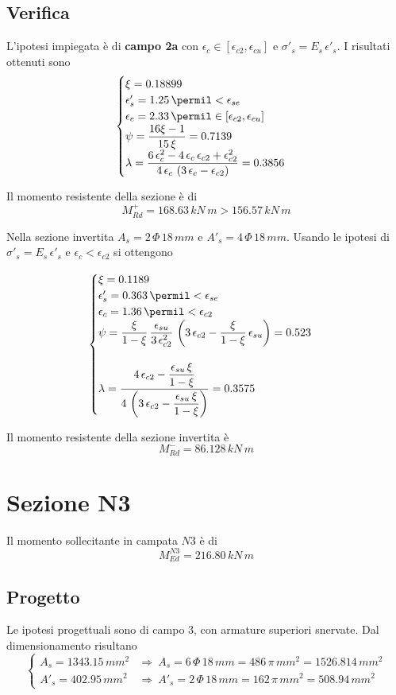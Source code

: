 \subsection{Verifica}
L'ipotesi impiegata è di \textbf{campo 2a} con $\epsilon_c \in \left[\epsilon_{c2}, \epsilon_{cu}\right]$ e $\sigma'_s = E_s\,\epsilon'_s$. I risultati ottenuti sono
\[
\begin{cases}
	\xi = 0.18899\\
	\epsilon'_s = 1.25\,\permil < \epsilon_{se}\\
	\epsilon_c = 2.33\,\permil \in \left[\epsilon_{c2}, \epsilon_{cu}\right]\\
	\psi = \dfrac{16\xi -1}{15\,\xi} = 0.7139 \\
	\lambda = \dfrac{6\,\epsilon_{c}^2 - 4\,\epsilon_{c}\,\epsilon_{c2} + \epsilon_{c2}^2}{4\,\epsilon_{c}\,\left(3\,\epsilon_c - \epsilon_{c2}\right)} = 0.3856
\end{cases}
\]

Il momento resistente della sezione è di
\[
M_{Rd}^+ = 168.63\,kN\,m > 156.57\,kN\,m
\]

Nella sezione invertita $A_s = 2\,\Phi\,18\,mm$ e $A'_s = 4\,\Phi\,18\,mm$. Usando le ipotesi di $\sigma'_s = E_s\,\epsilon'_s$ e $\epsilon_c < \epsilon_{c2}$ si ottengono

\[
\begin{cases}
	\xi = 0.1189\\
	\epsilon'_s = 0.363\,\permil<\epsilon_{se}\\
	\epsilon_c = 1.36\,\permil < \epsilon_{c2}\\
	\psi = \dfrac{\xi}{1-\xi}\,\dfrac{\epsilon_{su}}{3\,\epsilon_{c2}^2}\,\left(3\,\epsilon_{c2} - \dfrac{\xi}{1-\xi}\,\epsilon_{su}\right) = 0.523\\\\
	\lambda = \dfrac{4\,\epsilon_{c2} - \dfrac{\epsilon_{su}\,\xi}{1-\xi}}{4\,\left(3\,\epsilon_{c2} - \dfrac{\epsilon_{su}\,\xi}{1-\xi}\right)} = 0.3575
\end{cases}
\]

Il momento resistente della sezione invertita è
\[
M_{Rd}^- = 86.128\,kN\,m
\]

\section{Sezione N3}
Il momento sollecitante in campata $N3$ è di 
\[
M_{Ed}^{N3} = 216.80\,kN\,m
\]
\subsection{Progetto}
Le ipotesi progettuali sono di campo 3, con armature superiori snervate. Dal dimensionamento risultano
\[
\begin{cases}
	A_s = 1343.15\,mm^2 &\Longrightarrow~A_s = 6\,\Phi\,18\,mm = 486\,\pi\,mm^2 = 1526.814\,mm^2\\
	A'_s = 402.95\,mm^2 &\Longrightarrow~ A'_s = 2\,\Phi\,18\,mm = 162\,\pi\,mm^2 = 508.94\,mm^2
\end{cases}
\]

